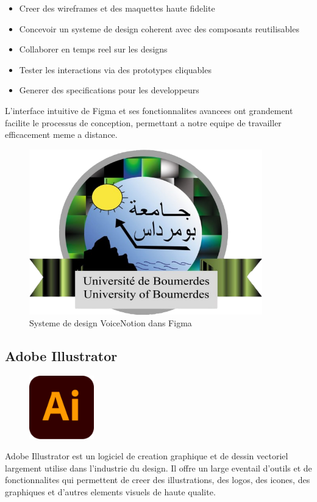 \begin{itemize}
    \item Creer des wireframes et des maquettes haute fidelite
    \item Concevoir un systeme de design coherent avec des composants reutilisables
    \item Collaborer en temps reel sur les designs
    \item Tester les interactions via des prototypes cliquables
    \item Generer des specifications pour les developpeurs
\end{itemize}

L'interface intuitive de Figma et ses fonctionnalites avancees ont grandement facilite le processus de conception, permettant a notre equipe de travailler efficacement meme a distance.

\begin{figure}[H]
\centering
\includegraphics[width=0.9\textwidth]{assets/docs/figma_design_system.png}
\caption{Systeme de design VoiceNotion dans Figma}
\label{fig:figma-design}
\end{figure}

\subsection{Adobe Illustrator}
\begin{figure}
    \centering
    \includegraphics[width=0.25\textwidth]{assets/docs/illustrator.png}
\end{figure}
Adobe Illustrator est un logiciel de creation graphique et de dessin vectoriel largement utilise dans l'industrie du design. Il offre un large eventail d'outils et de fonctionnalites qui permettent de creer des illustrations, des logos, des icones, des graphiques et d'autres elements visuels de haute qualite. 

